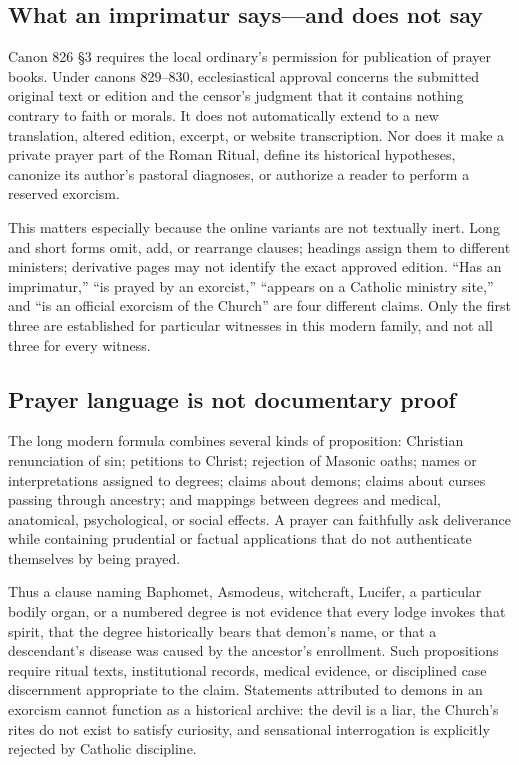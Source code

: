 \subsection{What an imprimatur says---and does not say}

Canon 826 \S3 requires the local ordinary's permission for publication of prayer books.  Under canons 829--830, ecclesiastical approval concerns the submitted original text or edition and the censor's judgment that it contains nothing contrary to faith or morals.  It does not automatically extend to a new translation, altered edition, excerpt, or website transcription.  Nor does it make a private prayer part of the Roman Ritual, define its historical hypotheses, canonize its author's pastoral diagnoses, or authorize a reader to perform a reserved exorcism.

This matters especially because the online variants are not textually inert.  Long and short forms omit, add, or rearrange clauses; headings assign them to different ministers; derivative pages may not identify the exact approved edition.  ``Has an imprimatur,'' ``is prayed by an exorcist,'' ``appears on a Catholic ministry site,'' and ``is an official exorcism of the Church'' are four different claims.  Only the first three are established for particular witnesses in this modern family, and not all three for every witness.

\subsection{Prayer language is not documentary proof}

The long modern formula combines several kinds of proposition: Christian renunciation of sin; petitions to Christ; rejection of Masonic oaths; names or interpretations assigned to degrees; claims about demons; claims about curses passing through ancestry; and mappings between degrees and medical, anatomical, psychological, or social effects.  A prayer can faithfully ask deliverance while containing prudential or factual applications that do not authenticate themselves by being prayed.

Thus a clause naming Baphomet, Asmodeus, witchcraft, Lucifer, a particular bodily organ, or a numbered degree is not evidence that every lodge invokes that spirit, that the degree historically bears that demon's name, or that a descendant's disease was caused by the ancestor's enrollment.  Such propositions require ritual texts, institutional records, medical evidence, or disciplined case discernment appropriate to the claim.  Statements attributed to demons in an exorcism cannot function as a historical archive: the devil is a liar, the Church's rites do not exist to satisfy curiosity, and sensational interrogation is explicitly rejected by Catholic discipline.

